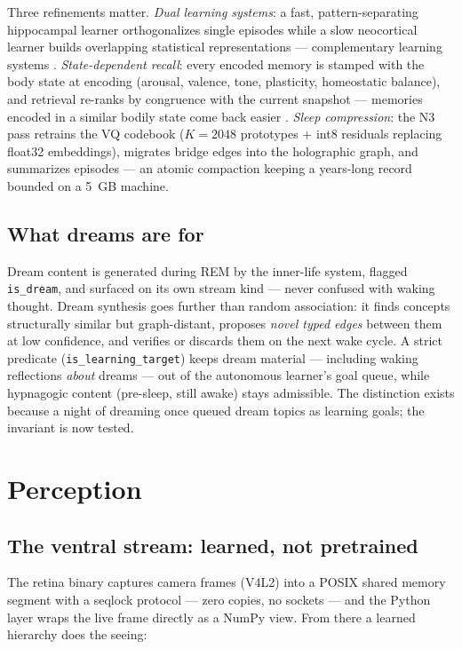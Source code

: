 \documentclass[11pt]{article}
\newcommand{\code}[1]{\texttt{\small #1}}
\begin{document}
Three refinements matter. \emph{Dual learning systems}: a fast,
pattern-separating hippocampal learner orthogonalizes single episodes
while a slow neocortical learner builds overlapping statistical
representations --- complementary learning systems
\cite{mcclelland,oreilly}. \emph{State-dependent
recall}: every encoded memory is stamped with the body state at
encoding (arousal, valence, tone, plasticity, homeostatic balance), and
retrieval re-ranks by congruence with the current snapshot ---
memories encoded in a similar bodily state come back easier
\cite{eich,bower}.
\emph{Sleep compression}: the N3 pass retrains the VQ codebook
($K{=}2048$ prototypes + int8 residuals replacing float32 embeddings),
migrates bridge edges into the holographic graph, and summarizes
episodes --- an atomic compaction keeping a years-long record bounded
on a 5~GB machine.

\subsection{What dreams are for}

Dream content is generated during REM by the inner-life system, flagged
\code{is\_dream}, and surfaced on its own stream kind --- never
confused with waking thought. Dream synthesis goes further than random
association: it finds concepts structurally similar but graph-distant,
proposes \emph{novel typed edges} between them at low confidence, and
verifies or discards them on the next wake cycle. A strict predicate
(\code{is\_learning\_target}) keeps dream material --- including waking
reflections \emph{about} dreams --- out of the autonomous learner's
goal queue, while hypnagogic content (pre-sleep, still awake) stays
admissible. The distinction exists because a night of dreaming once
queued dream topics as learning goals; the invariant is now tested.

\section{Perception}

\subsection{The ventral stream: learned, not pretrained}

The retina binary captures camera frames (V4L2) into a POSIX shared
memory segment with a seqlock protocol --- zero copies, no sockets ---
and the Python layer wraps the live frame directly as a NumPy view.
From there a learned hierarchy does the seeing:
\end{document}
